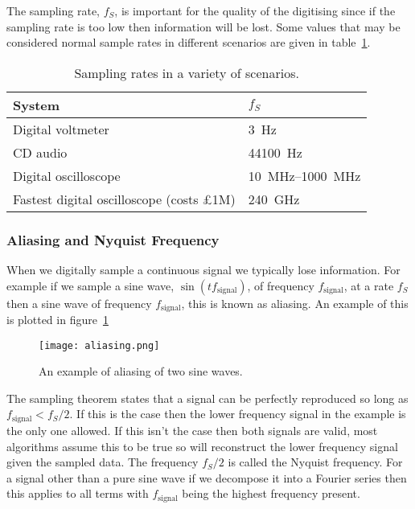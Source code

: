 \documentclass[a4paper]{article}
\begin{document}
    The sampling rate, \(f_S\), is important for the quality of the digitising since if the sampling rate is too low then information will be lost.
    Some values that may be considered normal sample rates in different scenarios are given in table~\ref{tab:sample rates}.
    \begin{table}[ht]
        \centering
        \begin{tabular}{ll}\hline
            System & \(f_S\)\\\hline
            Digital voltmeter & \SI{3}{\hertz}\\
            CD audio & \SI{44100}{\hertz}\\
            Digital oscilloscope & \SIrange{10}{1000}{\mega\hertz}\\
            Fastest digital oscilloscope (costs \pounds 1M) & \SI{240}{\giga\hertz}\\\hline
        \end{tabular}
        \caption{Sampling rates in a variety of scenarios.}
        \label{tab:sample rates}
    \end{table}
    \subsubsection{Aliasing and Nyquist Frequency}
    When we digitally sample a continuous signal we typically lose information.
    For example if we sample a sine wave, \(\sin(tf_{\text{signal}})\), of frequency \(f_\text{signal}\), at a rate \(f_S\) then a sine wave of frequency \(f_\text{signal}\), this is known as aliasing.
    An example of this is plotted in figure~\ref{fig:aliasing}
    \begin{figure}[ht]
        \centering
        \texttt{[image: aliasing.png]}
        \caption{An example of aliasing of two sine waves.}
        \label{fig:aliasing}
    \end{figure}
    The sampling theorem states that a signal can be perfectly reproduced so long as \(f_\text{signal} < f_S/2\).
    If this is the case then the lower frequency signal in the example is the only one allowed.
    If this isn't the case then both signals are valid, most algorithms assume this to be true so will reconstruct the lower frequency signal given the sampled data.
    The frequency \(f_S/2\) is called the Nyquist frequency.
    For a signal other than a pure sine wave if we decompose it into a Fourier series then this applies to all terms with \(f_\text{signal}\) being the highest frequency present.
    
\end{document}
